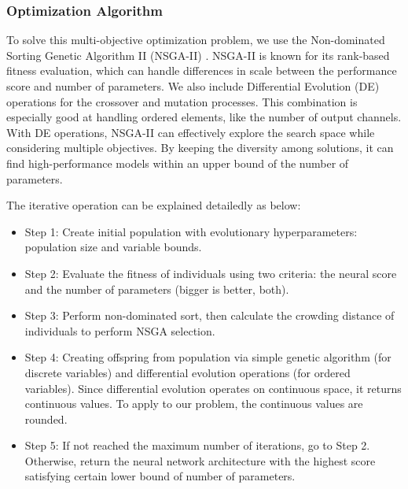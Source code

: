 \documentclass[lettersize,journal]{IEEEtran}
\begin{document}
        \subsubsection{Optimization Algorithm}
            To solve this multi-objective optimization problem, we use the Non-dominated Sorting Genetic Algorithm II (NSGA-II) \cite{NSGA}. NSGA-II is known for its rank-based fitness evaluation, which can handle differences in scale between the performance score and number of parameters. We also include Differential Evolution (DE) operations \cite{DE} for the crossover and mutation processes. This combination is especially good at handling ordered elements, like the number of output channels. With DE operations, NSGA-II can effectively explore the search space while considering multiple objectives. By keeping the diversity among solutions, it can find high-performance models within an upper bound of the number of parameters.

            The iterative operation can be explained detailedly as below:

            \begin{itemize}
                \item Step 1: Create initial population with evolutionary hyperparameters: population size and variable bounds.
                \item Step 2: Evaluate the fitness of individuals using two criteria: the neural score and the number of parameters (bigger is better, both).
                \item Step 3: Perform non-dominated sort, then calculate the crowding distance of individuals to perform NSGA selection.
                \item Step 4: Creating offspring from population via simple genetic algorithm (for discrete variables) and differential evolution operations (for ordered variables). Since differential evolution operates on continuous space, it returns continuous values. To apply to our problem, the continuous values are rounded.
                \item Step 5: If not reached the maximum number of iterations, go to Step 2. Otherwise, return the neural network architecture with the highest score satisfying certain lower bound of number of parameters.
            \end{itemize}
        
\end{document}
